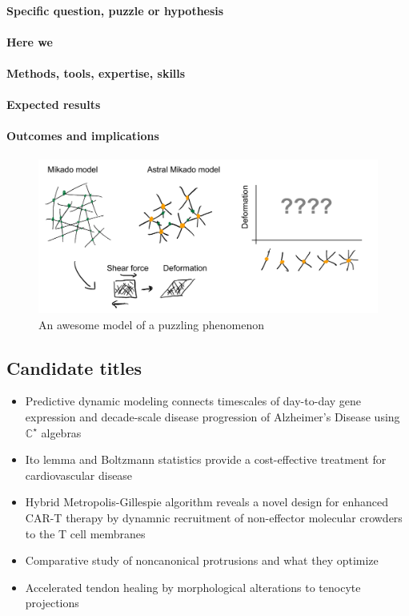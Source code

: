\documentclass[onecolumn,11pt]{article}
\begin{document}
\paragraph{Specific question, puzzle or hypothesis}\lipsum[2]
\paragraph{Here we}\lipsum[2]
\paragraph{Methods, tools, expertise, skills}\lipsum[2]
\paragraph{Expected results}\lipsum[2]
\paragraph{Outcomes and implications}\lipsum[2]


\begin{figure}[h!]
\centering
\includegraphics[width=4.5in]{figures/figJeanJacket.pdf}
\caption{\label{fig:JeanJacketSchematic}An awesome model of a puzzling phenomenon}
\end{figure}

\subsection{Candidate titles}

\begin{itemize}
\item Predictive dynamic modeling connects timescales of day-to-day gene expression and decade-scale disease progression of Alzheimer's Disease using $\mathbb{C}^\star$ algebras
\item Ito lemma and Boltzmann statistics provide a cost-effective treatment for cardiovascular disease
\item Hybrid Metropolis-Gillespie algorithm reveals a novel design for enhanced CAR-T therapy by dynamnic recruitment of non-effector molecular crowders to the T cell membranes
\item Comparative study of noncanonical protrusions and what they optimize
\item Accelerated tendon healing by morphological alterations to tenocyte projections
\end{itemize}
\end{document}

